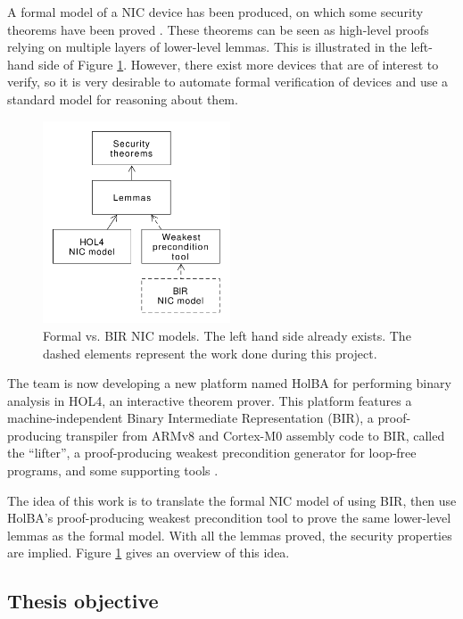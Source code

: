 \documentclass[10pt,a4paper]{article}
\begin{document}
\begin{multicols}{2}
A formal model of a {NIC} device has been produced, on which some security theorems have been proved \cite{haglund_formal_2016,haglund_trustworthy_nodate}. These theorems can be seen as high-level proofs relying on multiple layers of lower-level lemmas. This is illustrated in the left-hand side of Figure \ref{hol-v-bir-nic-model-simple}. However, there exist more devices that are of interest to verify, so it is very desirable to automate formal verification of devices and use a standard model for reasoning about them.
%
\begin{figure}[H]
  \centering
	\includegraphics[height=6cm]{figures/hol-v-bir-nic-model-simple.png}
	\caption{Formal vs. BIR NIC models. The left hand side already exists. The dashed elements represent the work done during this project.}
	\label{hol-v-bir-nic-model-simple}
\end{figure}

The team is now developing a new platform named {HolBA} for performing binary analysis in HOL4, an interactive theorem prover. This platform features a machine-independent Binary Intermediate Representation (BIR), a proof-producing transpiler from ARMv8 and Cortex-M$0$ assembly code to BIR, called the ``lifter'', a proof-producing weakest precondition generator for loop-free programs, and some supporting tools \cite{metere_sound_2017,lindner_trabin:_2019}.

The idea of this work is to translate the formal {NIC} model of \cite{haglund_formal_2016} using {BIR}, then use HolBA's proof-producing weakest precondition tool to prove the same lower-level lemmas as the formal model. With all the lemmas proved, the security properties are implied. Figure \ref{hol-v-bir-nic-model-simple} gives an overview of this idea.

\subsection{Thesis objective}


\end{multicols}
\end{document}
